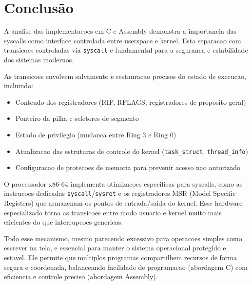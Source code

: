 \documentclass[10pt,a4paper]{article}
\begin{document}
\section{Conclusão}

A analise das implementacoes em C e Assembly demonstra a importancia das syscalls como interface controlada entre userspace e kernel. Esta separacao com transicoes controladas via \texttt{syscall} e fundamental para a seguranca e estabilidade dos sistemas modernos.

As transicoes envolvem salvamento e restauracao precisos do estado de execucao, incluindo:
\begin{itemize}\setlength\itemsep{0em}
  \item Conteudo dos registradores (RIP, RFLAGS, registradores de proposito geral)
  \item Ponteiro da pilha e seletores de segmento
  \item Estado de privilegio (mudanca entre Ring 3 e Ring 0)
  \item Atualizacao das estruturas de controle do kernel (\texttt{task\_struct}, \texttt{thread\_info})
  \item Configuracao de protecoes de memoria para prevenir acesso nao autorizado
\end{itemize}

O processador x86-64 implementa otimizacoes especificas para syscalls, como as instrucoes dedicadas \texttt{syscall}/\texttt{sysret} e os registradores MSR (Model Specific Registers) que armazenam os pontos de entrada/saida do kernel. Esse hardware especializado torna as transicoes entre modo usuario e kernel muito mais eficientes do que interrupcoes genericas.

Todo esse mecanismo, mesmo parecendo excessivo para operacoes simples como escrever na tela, e essencial para manter o sistema operacional protegido e estavel. Ele permite que multiplos programas compartilhem recursos de forma segura e coordenada, balanceando facilidade de programacao (abordagem C) com eficiencia e controle preciso (abordagem Assembly).
\end{document}
